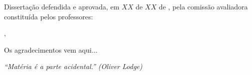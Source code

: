 \documentclass[
	12pt,				%
	openright,			%
	twoside,			%
	a4paper,			%
	english,			%
	brazil				%
	]{abntex2}
\begin{document}

%
% 
%
\begin{folhadeaprovacao}
%
   Dissertação defendida e aprovada, em $XX$ de $XX$ de \imprimirdata, pela comiss{\~a}o avaliadora constitu{\'i}da pelos professores:
   \vspace*{\fill}
   \vspace*{\fill}
   \vspace*{\fill}
   \vspace*{\fill}

   \begin{center}
    \vspace*{0.5cm}
    {\large\imprimirlocal}, {\large\imprimirdata}
    \vspace*{1cm}
  \end{center}

\end{folhadeaprovacao}


\begin{agradecimentos}
\noindent Os agradecimentos vem aqui...

\end{agradecimentos}

\begin{epigrafe}
    \vspace*{\fill}
	\begin{flushright}
		\textit{``Matéria é a parte acidental.'' (Oliver Lodge)}
	\end{flushright}
\end{epigrafe}
\end{document}
